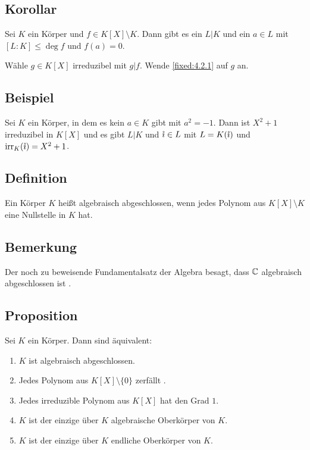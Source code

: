 \subsection{Korollar} Sei $K$ ein Körper und $f \in K[X] \setminus K$. Dann gibt es ein $L|K$ und ein $a \in L$ mit $[L:K] \leq \deg f$ und $f(a) = 0$.

\proof Wähle $g \in K[X]$ irreduzibel mit $g|f$. Wende \ref{fixed:4.2.1} auf $g$ an.

\subsection{Beispiel}  Sei $K$ ein Körper, in dem es kein $a \in K$ gibt mit $a^2 = -1$. Dann ist $X^2+1$ irreduzibel in $K[X]$ und es gibt $L|K$ und $\mathring\imath \in L$ mit $L = K(\mathring\imath)$ und $\operatorname{irr}_K(\mathring\imath) = X^2+1$.

\subsection{Definition} Ein Körper $K$ heißt algebraisch abgeschlossen, wenn jedes Polynom aus $K[X] \setminus K$ eine Nullstelle in $K$ hat.

\subsection{Bemerkung} Der noch zu beweisende Fundamentalsatz der Algebra besagt, dass $\mathbb C$ algebraisch abgeschlossen ist .

\subsection{Proposition} Sei $K$ ein Körper. Dann sind äquivalent:
\begin{enumerate}[label=(\alph*)]
	\item
		$K$ ist algebraisch abgeschlossen.
		
	\item
		Jedes Polynom aus $K[X]\setminus\{0\}$ zerfällt .
		
	\item
		Jedes irreduzible Polynom aus $K[X]$ hat den Grad $1$.
		
	\item
		$K$ ist der einzige über $K$ algebraische Oberkörper von $K$.
		
	\item
		$K$ ist der einzige über $K$ endliche Oberkörper von $K$.
\end{enumerate}

